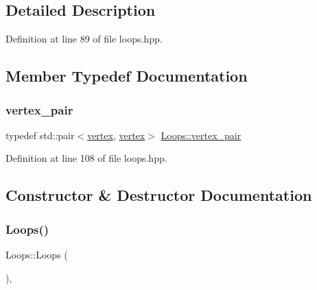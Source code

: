 \subsection{Detailed Description}


Definition at line 89 of file loops.\+hpp.



\subsection{Member Typedef Documentation}
\mbox{\label{classLoops_a0128208bc6f5092dcd97a7f2e75b168c}} 
\subsubsection{\texorpdfstring{vertex\+\_\+pair}{vertex\_pair}}
{\footnotesize\ttfamily typedef std\+::pair$<$\hyperlink{graph_8hpp_abefdcf0544e601805af44eca032cca14}{vertex}, \hyperlink{graph_8hpp_abefdcf0544e601805af44eca032cca14}{vertex}$>$ \hyperlink{classLoops_a0128208bc6f5092dcd97a7f2e75b168c}{Loops\+::vertex\+\_\+pair}\hspace{0.3cm}{\ttfamily [private]}}



Definition at line 108 of file loops.\+hpp.



\subsection{Constructor \& Destructor Documentation}
\mbox{\label{classLoops_a76c8286bf419d2b56d704f73d8b9afa6}} 
\subsubsection{\texorpdfstring{Loops()}{Loops()}\hspace{0.1cm}{\footnotesize\ttfamily [1/2]}}
{\footnotesize\ttfamily Loops\+::\+Loops (\begin{DoxyParamCaption}{ }\end{DoxyParamCaption})\hspace{0.3cm}{\ttfamily [private]}, {\ttfamily [delete]}}

\mbox{\label{classLoops_a4468afbab8156bb55299b15e35bb81ba}} 
